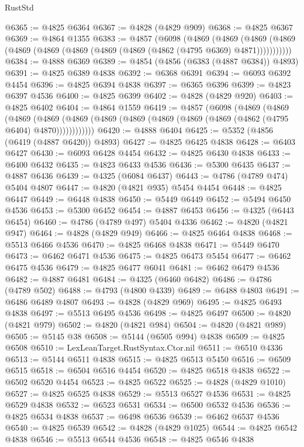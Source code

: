 \begin{lexlean}{RustStd}
\begin{coremodule}
@6365 := @4825 @6364
@6367 := @4828 (@4829 @909)
@6368 := @4825 @6367
@6369 := @4864 @1355
@6383 := @4857
    (@6098
      (@4869
        (@4869
          (@4869 (@4869 (@4869 (@4869 (@4869 (@4869 (@4869 (@4862 (@4795 @6369) @4871)))))))))))
@6384 := @4888 @6369
@6389 := @4854 (@4856 (@6383 (@4887 @6384)) @4893)
@6391 := @4825 @6389 @4838
@6392 := @6368 @6391
@6394 := @6093 @6392 @4454
@6396 := @4825 @6394 @4838
@6397 := @6365 @6396
@6399 := @4823 @6397 @4536
@6400 := @4825 @6399
@6402 := @4828 (@4829 @920)
@6403 := @4825 @6402
@6404 := @4864 @1559
@6419 := @4857
    (@6098
      (@4869
        (@4869
          (@4869
            (@4869 (@4869 (@4869 (@4869 (@4869 (@4869 (@4869 (@4862 (@4795 @6404) @4870))))))))))))
@6420 := @4888 @6404
@6425 := @5352 (@4856 (@6419 (@4887 @6420)) @4893)
@6427 := @4825 @6425 @4838
@6428 := @6403 @6427
@6430 := @6093 @6428 @4454
@6432 := @4825 @6430 @4838
@6433 := @6400 @6432
@6435 := @4823 @6433 @4536
@6436 := @5300 @6435
@6437 := @4887 @6436
@6439 := @4325 (@6084 @6437)
@6443 := @4786 (@4789 @474) @5404 @4807
@6447 := @4820 (@4821 @935) @5454 @4454
@6448 := @4825 @6447
@6449 := @6448 @4838
@6450 := @5449 @6449
@6452 := @5494 @6450 @4536
@6453 := @5300 @6452
@6454 := @4887 @6453
@6456 := @4325 (@6443 @6454)
@6460 := @4786 (@4789 @497) @5404 @4336
@6462 := @4820 (@4821 @947)
@6464 := @4828 (@4829 @949)
@6466 := @4825 @6464 @4838
@6468 := @5513 @6466 @4536
@6470 := @4825 @6468 @4838
@6471 := @5449 @6470
@6473 := @6462 @6471 @4536
@6475 := @4825 @6473 @5454
@6477 := @6462 @6475 @4536
@6479 := @4825 @6477 @6041
@6481 := @6462 @6479 @4536
@6482 := @4887 @6481
@6484 := @4325 (@6460 @6482)
@6486 := @4786 (@4789 @502)
@6488 := @4793 (@4800 @4339)
@6489 := @6488 @4803
@6491 := @6486 @6489 @4807
@6493 := @4828 (@4829 @969)
@6495 := @4825 @6493 @4838
@6497 := @5513 @6495 @4536
@6498 := @4825 @6497
@6500 := @4820 (@4821 @979)
@6502 := @4820 (@4821 @984)
@6504 := @4820 (@4821 @989)
@6505 := @5145 @38
@6508 := @5144 (@6505 @994) @4838
@6509 := @4825 @6508
@6510 := LexLeanTarget.RustSyntax.Ctor.nil
@6511 := @6510 @4336
@6513 := @5144 @6511 @4838
@6515 := @4825 @6513 @5450
@6516 := @6509 @6515
@6518 := @6504 @6516 @4454
@6520 := @4825 @6518 @4838
@6522 := @6502 @6520 @4454
@6523 := @4825 @6522
@6525 := @4828 (@4829 @1010)
@6527 := @4825 @6525 @4838
@6529 := @5513 @6527 @4536
@6531 := @4825 @6529 @4838
@6532 := @6523 @6531
@6534 := @6500 @6532 @4536
@6536 := @4825 @6534 @4838
@6537 := @6498 @6536
@6539 := @6462 @6537 @4536
@6540 := @4825 @6539
@6542 := @4828 (@4829 @1025)
@6544 := @4825 @6542 @4838
@6546 := @5513 @6544 @4536
@6548 := @4825 @6546 @4838

\end{coremodule}
\end{lexlean}
